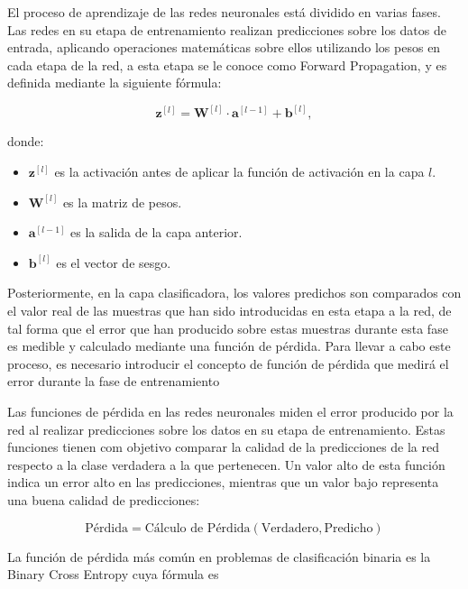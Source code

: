 \documentclass{uathesis-es}
\begin{document}

El proceso de aprendizaje de las redes neuronales está dividido en varias fases. Las redes en su etapa de entrenamiento realizan predicciones sobre los datos de entrada, aplicando operaciones matemáticas sobre ellos utilizando los pesos en cada etapa de la red, a esta etapa se le conoce como Forward Propagation, y es definida mediante la siguiente fórmula:


\[
    \mathbf{z}^{[l]} = \mathbf{W}^{[l]} \cdot \mathbf{a}^{[l-1]} + \mathbf{b}^{[l]},
\]

donde:
\begin{itemize}
    \item \(\mathbf{z}^{[l]}\) es la activación antes de aplicar la función de activación en la capa \(l\).
    \item \(\mathbf{W}^{[l]}\) es la matriz de pesos.
    \item \(\mathbf{a}^{[l-1]}\) es la salida de la capa anterior.
    \item \(\mathbf{b}^{[l]}\) es el vector de sesgo.
\end{itemize}

Posteriormente, en la capa clasificadora, los valores predichos son comparados con el valor real de las muestras que han sido introducidas en esta etapa a la red, de tal forma que el error que han producido sobre estas muestras durante esta fase es medible y calculado mediante una función de pérdida. Para llevar a cabo este proceso, es necesario introducir el concepto de función de pérdida que medirá el error durante la fase de entrenamiento



Las funciones de pérdida en las redes neuronales miden el error producido por la red al realizar predicciones sobre los datos en su etapa de entrenamiento. Estas funciones tienen com objetivo comparar la calidad de la predicciones de la red respecto a la clase verdadera a la que pertenecen. Un valor alto de esta función indica un error alto en las predicciones, mientras que un valor bajo representa una buena calidad de predicciones:

\[
    \text{Pérdida} = \text{Cálculo de Pérdida} (\text{Verdadero}, \text{Predicho})
\]

La función de pérdida más común en problemas de clasificación binaria es la Binary Cross Entropy cuya fórmula es 
\end{document}
